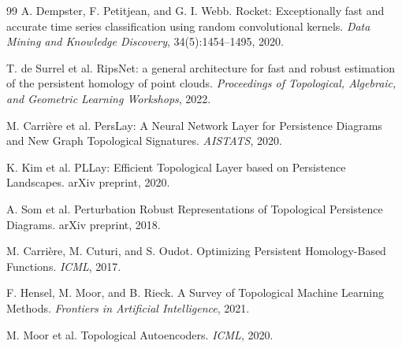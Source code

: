 \documentclass[a4paper,11pt]{article}
\begin{document}
\begin{thebibliography}{99}
A. Dempster, F. Petitjean, and G. I. Webb.
\newblock Rocket: Exceptionally fast and accurate time series classification using random convolutional kernels.
\newblock \emph{Data Mining and Knowledge Discovery}, 34(5):1454--1495, 2020.

T. de Surrel et al.
\newblock RipsNet: a general architecture for fast and robust estimation of the persistent homology of point clouds.
\newblock \emph{Proceedings of Topological, Algebraic, and Geometric Learning Workshops}, 2022.

M. Carri\`ere et al.
\newblock PersLay: A Neural Network Layer for Persistence Diagrams and New Graph Topological Signatures.
\newblock \emph{AISTATS}, 2020.

K. Kim et al.
\newblock PLLay: Efficient Topological Layer based on Persistence Landscapes.
\newblock arXiv preprint, 2020.

A. Som et al.
\newblock Perturbation Robust Representations of Topological Persistence Diagrams.
\newblock arXiv preprint, 2018.

M. Carri\`ere, M. Cuturi, and S. Oudot.
\newblock Optimizing Persistent Homology-Based Functions.
\newblock \emph{ICML}, 2017.

F. Hensel, M. Moor, and B. Rieck.
\newblock A Survey of Topological Machine Learning Methods.
\newblock \emph{Frontiers in Artificial Intelligence}, 2021.

M. Moor et al.
\newblock Topological Autoencoders.
\newblock \emph{ICML}, 2020.
\end{thebibliography}
\end{document}
